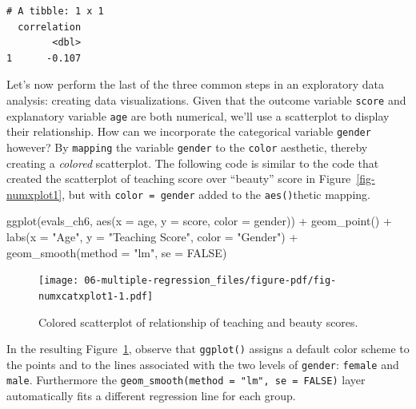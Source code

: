 \documentclass[
  letterpaper,
  DIV=11,
  numbers=noendperiod]{scrreprt}
\newenvironment{Shaded}{\begin{snugshade}}{\end{snugshade}}
\newcommand{\AttributeTok}[1]{\textcolor[rgb]{0.40,0.45,0.13}{#1}}
\newcommand{\ConstantTok}[1]{\textcolor[rgb]{0.56,0.35,0.01}{#1}}
\newcommand{\FunctionTok}[1]{\textcolor[rgb]{0.28,0.35,0.67}{#1}}
\newcommand{\NormalTok}[1]{\textcolor[rgb]{0.00,0.23,0.31}{#1}}
\newcommand{\SpecialCharTok}[1]{\textcolor[rgb]{0.37,0.37,0.37}{#1}}
\newcommand{\StringTok}[1]{\textcolor[rgb]{0.13,0.47,0.30}{#1}}
\theoremstyle{definition}
\theoremstyle{remark}
\begin{document}
\begin{verbatim}
# A tibble: 1 x 1
  correlation
        <dbl>
1      -0.107
\end{verbatim}

Let's now perform the last of the three common steps in an exploratory
data analysis: creating data visualizations. Given that the outcome
variable \texttt{score} and explanatory variable \texttt{age} are both
numerical, we'll use a scatterplot to display their relationship. How
can we incorporate the categorical variable \texttt{gender} however? By
\texttt{mapping} the variable \texttt{gender} to the \texttt{color}
aesthetic, thereby creating a \emph{colored} scatterplot. The following
code is similar to the code that created the scatterplot of teaching
score over ``beauty'' score in Figure~\ref{fig-numxplot1}, but with
\texttt{color\ =\ gender} added to the \texttt{aes()}thetic mapping.

\begin{Shaded}
\begin{Highlighting}[]
\FunctionTok{ggplot}\NormalTok{(evals\_ch6, }\FunctionTok{aes}\NormalTok{(}\AttributeTok{x =}\NormalTok{ age, }\AttributeTok{y =}\NormalTok{ score, }\AttributeTok{color =}\NormalTok{ gender)) }\SpecialCharTok{+}
  \FunctionTok{geom\_point}\NormalTok{() }\SpecialCharTok{+}
  \FunctionTok{labs}\NormalTok{(}\AttributeTok{x =} \StringTok{"Age"}\NormalTok{, }\AttributeTok{y =} \StringTok{"Teaching Score"}\NormalTok{, }\AttributeTok{color =} \StringTok{"Gender"}\NormalTok{) }\SpecialCharTok{+}
  \FunctionTok{geom\_smooth}\NormalTok{(}\AttributeTok{method =} \StringTok{"lm"}\NormalTok{, }\AttributeTok{se =} \ConstantTok{FALSE}\NormalTok{)}
\end{Highlighting}
\end{Shaded}

\begin{figure}

{\centering \texttt{[image: 06-multiple-regression\_files/figure-pdf/fig-numxcatxplot1-1.pdf]}

}

\caption{\label{fig-numxcatxplot1}Colored scatterplot of relationship of
teaching and beauty scores.}

\end{figure}

In the resulting Figure~\ref{fig-numxcatxplot1}, observe that
\texttt{ggplot()} assigns a default color scheme to the points and to
the lines associated with the two levels of \texttt{gender}:
\texttt{female} and \texttt{male}. Furthermore the
\texttt{geom\_smooth(method\ =\ "lm",\ se\ =\ FALSE)} layer
automatically fits a different regression line for each group.
\end{document}
